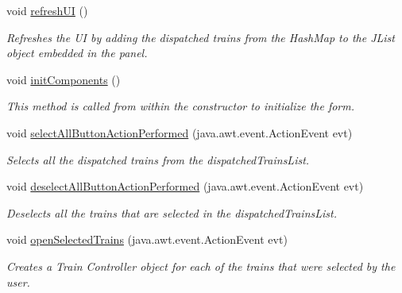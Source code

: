 \begin{DoxyCompactItemize}
\item 
void \hyperlink{classTrainControllerComps_1_1TCDispatchedTrainFrame_aa28b4a0ad4f88726984015206db66ab8}{refresh\+UI} ()
\begin{DoxyCompactList}\small\item\em Refreshes the UI by adding the dispatched trains from the Hash\+Map to the J\+List object embedded in the panel. \end{DoxyCompactList}\item 
void \hyperlink{classTrainControllerComps_1_1TCDispatchedTrainFrame_a7bbb347b25d41c9df04777346a1fd5b6}{init\+Components} ()
\begin{DoxyCompactList}\small\item\em This method is called from within the constructor to initialize the form. \end{DoxyCompactList}\item 
void \hyperlink{classTrainControllerComps_1_1TCDispatchedTrainFrame_a0eb1b68c1e998a0d19cbe6b68fe5576c}{select\+All\+Button\+Action\+Performed} (java.\+awt.\+event.\+Action\+Event evt)
\begin{DoxyCompactList}\small\item\em Selects all the dispatched trains from the dispatched\+Trains\+List. \end{DoxyCompactList}\item 
void \hyperlink{classTrainControllerComps_1_1TCDispatchedTrainFrame_a45691ba29b476f2b2deb616e88dbb498}{deselect\+All\+Button\+Action\+Performed} (java.\+awt.\+event.\+Action\+Event evt)
\begin{DoxyCompactList}\small\item\em Deselects all the trains that are selected in the dispatched\+Trains\+List. \end{DoxyCompactList}\item 
void \hyperlink{classTrainControllerComps_1_1TCDispatchedTrainFrame_a80f4dcaad673ecbc84321b4662ed526a}{open\+Selected\+Trains} (java.\+awt.\+event.\+Action\+Event evt)
\begin{DoxyCompactList}\small\item\em Creates a Train Controller object for each of the trains that were selected by the user. \end{DoxyCompactList}\end{DoxyCompactItemize}
